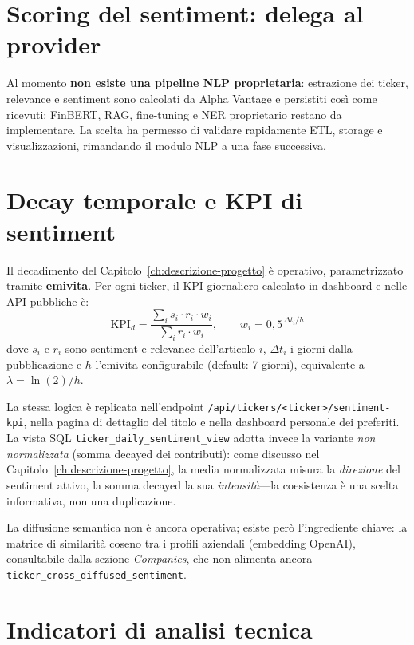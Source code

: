 \section{Scoring del sentiment: delega al provider}

Al momento \textbf{non esiste una pipeline NLP proprietaria}: estrazione dei ticker, relevance e sentiment sono calcolati da Alpha Vantage e persistiti così come ricevuti; FinBERT, RAG, fine-tuning e NER proprietario restano da implementare.
La scelta ha permesso di validare rapidamente ETL, storage e visualizzazioni, rimandando il modulo NLP a una fase successiva.

\section{Decay temporale e KPI di sentiment}

Il decadimento del Capitolo~\ref{ch:descrizione-progetto} è operativo, parametrizzato tramite \textbf{emivita}.
Per ogni ticker, il KPI giornaliero calcolato in dashboard e nelle API pubbliche è:
\[
\text{KPI}_d = \frac{\sum_i s_i \cdot r_i \cdot w_i}{\sum_i r_i \cdot w_i},
\qquad
w_i = 0{,}5^{\,\Delta t_i / h}
\]
dove $s_i$ e $r_i$ sono sentiment e relevance dell'articolo $i$, $\Delta t_i$ i giorni dalla pubblicazione e $h$ l'emivita configurabile (default: 7 giorni), equivalente a $\lambda = \ln(2)/h$.

La stessa logica è replicata nell'endpoint \texttt{/api/tickers/<ticker>/sentiment-kpi}, nella pagina di dettaglio del titolo e nella dashboard personale dei preferiti.
La vista SQL \texttt{ticker\_daily\_sentiment\_view} adotta invece la variante \emph{non normalizzata} (somma decayed dei contributi): come discusso nel Capitolo~\ref{ch:descrizione-progetto}, la media normalizzata misura la \emph{direzione} del sentiment attivo, la somma decayed la sua \emph{intensità}---la coesistenza è una scelta informativa, non una duplicazione.

La diffusione semantica non è ancora operativa; esiste però l'ingrediente chiave: la matrice di similarità coseno tra i profili aziendali (embedding OpenAI), consultabile dalla sezione \textit{Companies}, che non alimenta ancora \texttt{ticker\_cross\_diffused\_sentiment}.

\section{Indicatori di analisi tecnica}
\label{sec:analisi-tecnica}

